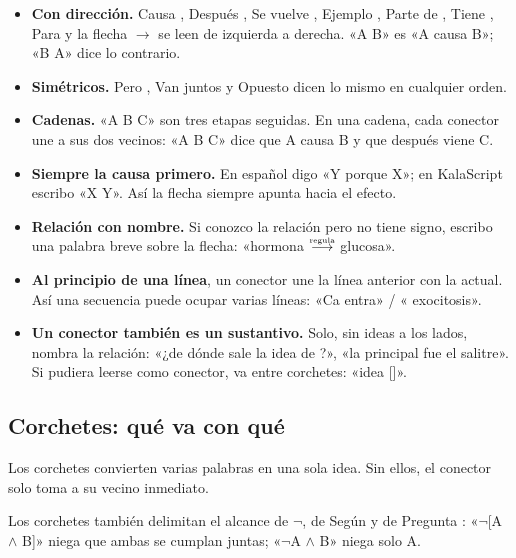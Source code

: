 \begin{itemize}
\item \textbf{Con dirección.} Causa , Después , Se vuelve
 , Ejemplo , Parte de , Tiene , Para
  y la flecha \(\to\) se leen de izquierda a derecha. «A  B» es «A causa B»; «B  A» dice
 lo contrario.
\item \textbf{Simétricos.} Pero , Van juntos  y Opuesto
  dicen lo mismo en cualquier orden.
\item \textbf{Cadenas.} «A  B  C» son tres etapas seguidas.
 En una cadena, cada conector une a sus dos vecinos: «A  B  C»
 dice que A causa B y que después viene C.
\item \textbf{Siempre la causa primero.} En español digo «Y porque X»; en
 KalaScript escribo «X  Y». Así la flecha siempre apunta hacia el efecto.
\item \textbf{Relación con nombre.} Si conozco la relación pero no tiene signo,
 escribo una palabra breve sobre la flecha: «hormona
 \(\overset{\text{\tiny regula}}{\longrightarrow}\) glucosa».
\item \textbf{Al principio de una línea}, un conector une la línea anterior con
 la actual. Así una secuencia puede ocupar varias líneas:
 «Ca entra» / « exocitosis».
\item \textbf{Un conector también es un sustantivo.} Solo, sin ideas a los lados,
 nombra la relación: «¿de dónde sale la idea de ?», «la 
 principal fue el salitre». Si pudiera leerse como conector, va entre
 corchetes: «idea []».
\end{itemize}

\subsection{Corchetes: qué va con qué}
Los corchetes convierten varias palabras en una sola idea. Sin ellos, el conector
solo toma a su vecino inmediato.
\begin{apunte}
\end{apunte}

Los corchetes también delimitan el alcance de \(\neg\), de Según  y de
Pregunta : «\(\neg\)[A \(\wedge\) B]» niega que ambas se cumplan
juntas; «\(\neg\)A \(\wedge\) B» niega solo A.

